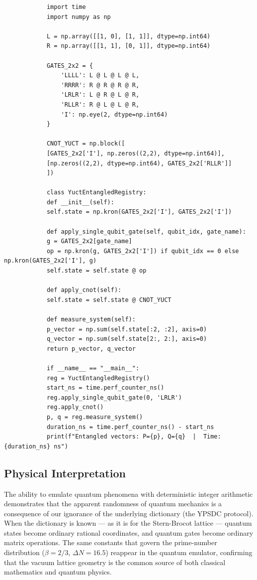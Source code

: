\documentclass[12pt,a4paper]{article}
\begin{document}
	\begin{tcolorbox}[title=YUCT CNOT Entanglement Emulator (Python), breakable]
		\begin{lstlisting}
			import time
			import numpy as np
			
			L = np.array([[1, 0], [1, 1]], dtype=np.int64)
			R = np.array([[1, 1], [0, 1]], dtype=np.int64)
			
			GATES_2x2 = {
				'LLLL': L @ L @ L @ L,
				'RRRR': R @ R @ R @ R,
				'LRLR': L @ R @ L @ R,
				'RLLR': R @ L @ L @ R,
				'I': np.eye(2, dtype=np.int64)
			}
			
			CNOT_YUCT = np.block([
			[GATES_2x2['I'], np.zeros((2,2), dtype=np.int64)],
			[np.zeros((2,2), dtype=np.int64), GATES_2x2['RLLR']]
			])
			
			class YuctEntangledRegistry:
			def __init__(self):
			self.state = np.kron(GATES_2x2['I'], GATES_2x2['I'])
			
			def apply_single_qubit_gate(self, qubit_idx, gate_name):
			g = GATES_2x2[gate_name]
			op = np.kron(g, GATES_2x2['I']) if qubit_idx == 0 else np.kron(GATES_2x2['I'], g)
			self.state = self.state @ op
			
			def apply_cnot(self):
			self.state = self.state @ CNOT_YUCT
			
			def measure_system(self):
			p_vector = np.sum(self.state[:2, :2], axis=0)
			q_vector = np.sum(self.state[2:, 2:], axis=0)
			return p_vector, q_vector
			
			if __name__ == "__main__":
			reg = YuctEntangledRegistry()
			start_ns = time.perf_counter_ns()
			reg.apply_single_qubit_gate(0, 'LRLR')
			reg.apply_cnot()
			p, q = reg.measure_system()
			duration_ns = time.perf_counter_ns() - start_ns
			print(f"Entangled vectors: P={p}, Q={q}  |  Time: {duration_ns} ns")
		\end{lstlisting}
	\end{tcolorbox}
	
	\subsection{Physical Interpretation}
	
	The ability to emulate quantum phenomena with deterministic integer arithmetic demonstrates that the apparent randomness of quantum mechanics is a consequence of our ignorance of the underlying dictionary (the YPSDC protocol).  When the dictionary is known --- as it is for the Stern-Brocot lattice --- quantum states become ordinary rational coordinates, and quantum gates become ordinary matrix operations.  The same constants that govern the prime-number distribution (\(\beta=2/3\), \(\Delta N=16.5\)) reappear in the quantum emulator, confirming that the vacuum lattice geometry is the common source of both classical mathematics and quantum physics.
	
\end{document}
